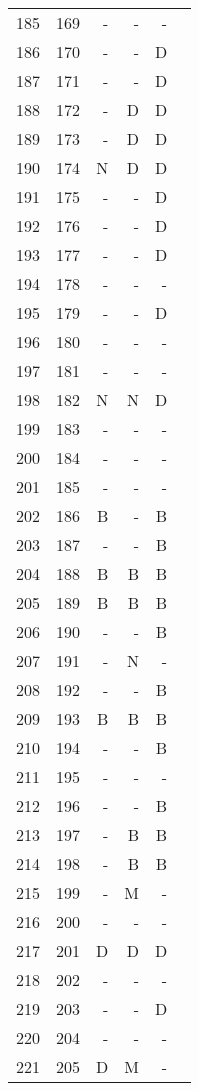 \begin{longtable}{rrrrrr}
  185 & 169 & - & - & - &  \\ 
  186 & 170 & - & - & D &  \\ 
  187 & 171 & - & - & D &  \\ 
  188 & 172 & - & D & D &  \\ 
  189 & 173 & - & D & D &  \\ 
  190 & 174 & N & D & D &  \\ 
  191 & 175 & - & - & D &  \\ 
  192 & 176 & - & - & D &  \\ 
  193 & 177 & - & - & D &  \\ 
  194 & 178 & - & - & - &  \\ 
  195 & 179 & - & - & D &  \\ 
  196 & 180 & - & - & - &  \\ 
  197 & 181 & - & - & - &  \\ 
  198 & 182 & N & N & D &  \\ 
  199 & 183 & - & - & - &  \\ 
  200 & 184 & - & - & - &  \\ 
  201 & 185 & - & - & - &  \\ 
  202 & 186 & B & - & B &  \\ 
  203 & 187 & - & - & B &  \\ 
  204 & 188 & B & B & B &  \\ 
  205 & 189 & B & B & B &  \\ 
  206 & 190 & - & - & B &  \\ 
  207 & 191 & - & N & - &  \\ 
  208 & 192 & - & - & B &  \\ 
  209 & 193 & B & B & B &  \\ 
  210 & 194 & - & - & B &  \\ 
  211 & 195 & - & - & - &  \\ 
  212 & 196 & - & - & B &  \\ 
  213 & 197 & - & B & B &  \\ 
  214 & 198 & - & B & B &  \\ 
  215 & 199 & - & M & - &  \\ 
  216 & 200 & - & - & - &  \\ 
  217 & 201 & D & D & D &  \\ 
  218 & 202 & - & - & - &  \\ 
  219 & 203 & - & - & D &  \\ 
  220 & 204 & - & - & - &  \\ 
  221 & 205 & D & M & - &  \\ 

\end{longtable}
